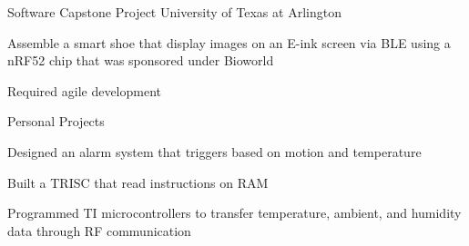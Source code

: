 


\begin{cventries}


\cventry
{} %
{Software Capstone Project } %
{University of Texas at Arlington} %
{} %
{ %
\begin{cvitems}
\item {Assemble a smart shoe that display images on an E-ink screen via BLE using a nRF52 chip that was sponsored under Bioworld}
\item {Required agile development}
\end{cvitems}
}

\cventry
{} %
{Personal Projects} %
{} %
{} %
{ %
\begin{cvitems}
	\item {Designed an alarm system that triggers based on motion and temperature}
	\item {Built a TRISC that read instructions on RAM}
	\item {Programmed TI microcontrollers to transfer temperature, ambient, and humidity data through RF communication}
\end{cvitems}
}

\end{cventries}